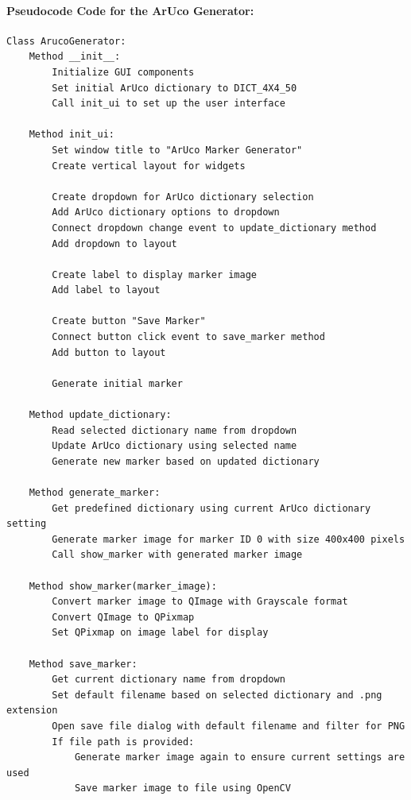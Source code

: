 \documentclass[12pt]{article}
\begin{document}
\begin{enumerate}
\begin{enumerate}
                        \paragraph{Pseudocode Code for the ArUco Generator:}
                        \begin{verbatim}
Class ArucoGenerator:
    Method __init__:
        Initialize GUI components
        Set initial ArUco dictionary to DICT_4X4_50
        Call init_ui to set up the user interface

    Method init_ui:
        Set window title to "ArUco Marker Generator"
        Create vertical layout for widgets

        Create dropdown for ArUco dictionary selection
        Add ArUco dictionary options to dropdown
        Connect dropdown change event to update_dictionary method
        Add dropdown to layout

        Create label to display marker image
        Add label to layout

        Create button "Save Marker"
        Connect button click event to save_marker method
        Add button to layout

        Generate initial marker

    Method update_dictionary:
        Read selected dictionary name from dropdown
        Update ArUco dictionary using selected name
        Generate new marker based on updated dictionary

    Method generate_marker:
        Get predefined dictionary using current ArUco dictionary setting
        Generate marker image for marker ID 0 with size 400x400 pixels
        Call show_marker with generated marker image

    Method show_marker(marker_image):
        Convert marker image to QImage with Grayscale format
        Convert QImage to QPixmap
        Set QPixmap on image label for display

    Method save_marker:
        Get current dictionary name from dropdown
        Set default filename based on selected dictionary and .png extension
        Open save file dialog with default filename and filter for PNG
        If file path is provided:
            Generate marker image again to ensure current settings are used
            Save marker image to file using OpenCV


\end{verbatim}
\end{enumerate}
\end{enumerate}
\end{document}
